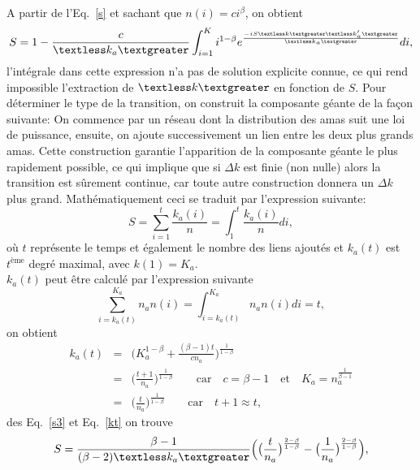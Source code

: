 A partir de l'Eq.~\eqref{s} et sachant que $n(i)=ci^{\beta}$, on obtient
\begin{equation}
S=1-\frac{c}{\kma}\int_{i=1}^Ki^{1-\beta}e^{\frac{-iS\km\kmap}{\kma}}di
\label{s2},
\end{equation}
l'intégrale dans cette expression n'a pas de solution explicite connue, ce qui rend  impossible l'extraction de $\km$ en fonction de $S$. 
Pour déterminer le type de la transition, on construit la composante géante de la façon suivante:
On commence par un réseau dont la distribution des amas suit une loi de puissance, ensuite, on ajoute successivement un lien entre les deux plus 
grands amas. Cette construction garantie l'apparition de la composante géante le plus rapidement possible, ce qui implique que si $\Delta k$ est finie (non nulle) alors la transition est sûrement continue, car toute autre construction donnera un $\Delta k$ plus grand. Mathématiquement ceci se traduit par l'expression suivante: 
\begin{equation}
S=\sum_{i=1}^t\frac{k_a(i)}{n}=\int_{1}^{t}\frac{k_a(i)}{n}di,
\label{s3}
\end{equation}
où $t$ représente le temps et également le nombre des liens ajoutés et $k_a(t)$ est $t^{\text{ème}}$ degré maximal, avec $k(1)=K_a$.\\
$k_a(t)$ peut être calculé par l'expression suivante
\begin{equation}
\sum_{i=k_a (t)}^{K_a} n_an(i)=\int_{i=k_a(t)}^{K_a}n_an(i)di=t,
\end{equation}
on obtient
\begin{eqnarray}
k_a(t)&=&\Big(K_a^{1-\beta}+\frac{(\beta-1)t}{cn_a}\Big)^{\frac{1}{1-\beta}}\nonumber\\
&=& \Big(\frac{t+1}{n_a}\Big)^{\frac{1}{1-\beta}} \quad \quad  \text{car} \quad c=\beta-1 \quad \text{et} \quad K_a=n_a^{\frac{1}{\beta-1}} \nonumber\\
&=& \Big(\frac{t}{n_a}\Big)^{\frac{1}{1-\beta}}
\quad \quad  \text{car} \quad t+1\approx t,
\label{kt}
\end{eqnarray}
des Eq.~\eqref{s3} et Eq.~\eqref{kt} on trouve
\begin{equation}
S=\frac{\beta-1}{(\beta-2)\kma}\Big(\big(\frac{t}{n_a}\big)^{\frac{2-\beta}{1-\beta}}-\big(\frac{1}{n_a}\big)^{\frac{2-\beta}{1-\beta}}\Big),
\label{s4}
\end{equation}

